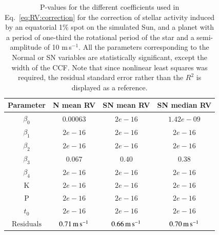 \documentclass{aa}
\def\ms{\hbox{\,m\,s$^{-1}$}}         %
\begin{document}
\begin{table}
\begin{center}
\caption{P-values for the different coefficients used in Eq.~\eqref{eq:RV:correction} for the correction of stellar activity induced by an equatorial 1\% spot on the simulated Sun, and a planet with a period of one-third the rotational period of the star and a semi-amplitude  of 10\,\ms. All the parameters corresponding to the Normal or SN variables are statistically significant, except the width of the CCF. Note that since nonlinear least squares was required, the residual standard error rather than the $R^2$ is displayed as a reference.}
\label{table:spotplanet.test}
\begin{tabular}{|c|c|c|c|}
\hline
Parameter          & N mean RV         &   SN mean RV &   SN median RV \\
\hline
$\beta_{0}$            &    $0.00063$    & $2e-16$  & $1.42e-09$ \\
\hline
$\beta_{1}$            &    $2e-16$    & $2e-16$  & $2e-16$ \\
\hline
$\beta_{2}$            &     $2e-16$   & $2e-16$ & $2e-16$\\
\hline
$\beta_{3}$            &     $0.067$   &  $0.40$  & $0.38$\\
\hline
$\beta_{4}$            &     $2e-16$   &  $2e-16$ & $2e-16$\\
\hline
K            &     $2e-16$   &  $2e-16$   & $2e-16$ \\
\hline
P            &     $2e-16$   &  $2e-16$ & $2e-16$ \\
\hline
$t_{0}$            &     $2e-16$   &  $2e-16$ & $2e-16$ \\
\hline
$\text{Residuals}$      &     $0.71 \ms$    &  $ 0.66 \ms$ & $0.70 \ms$  \\
\hline
\end{tabular}
\end{center}
\end{table}
\end{document}
